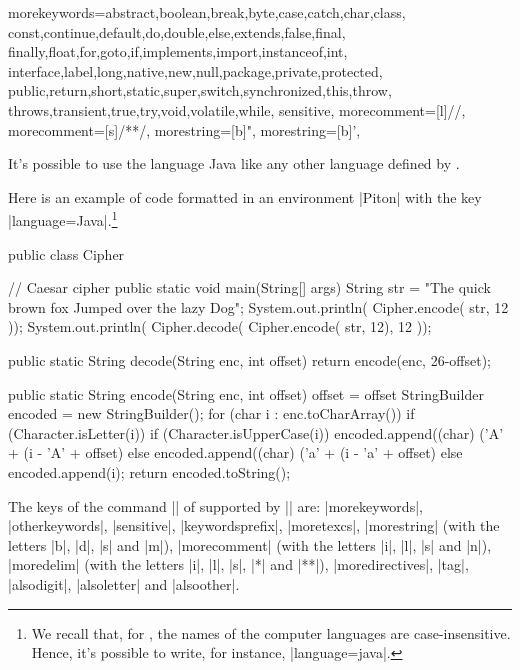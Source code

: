 \documentclass{article}
\begin{document}
  {morekeywords={abstract,boolean,break,byte,case,catch,char,class,
      const,continue,default,do,double,else,extends,false,final,
      finally,float,for,goto,if,implements,import,instanceof,int,
      interface,label,long,native,new,null,package,private,protected,
      public,return,short,static,super,switch,synchronized,this,throw,
      throws,transient,true,try,void,volatile,while},
   sensitive,
   morecomment=[l]//,
   morecomment=[s]{/*}{*/},
   morestring=[b]",
   morestring=[b]',
  }

\medskip
It's possible to use the language Java like any other language defined by
.

Here is an example of code formatted in an environment |{Piton}| with
the key |language=Java|.\footnote{We recall that, for , the names
of the computer languages are case-insensitive. Hence, it's possible to
write, for instance, |language=java|.}


\bigskip
\begingroup
\small
{}
\begin{Piton}[language = java]
public class Cipher {  // Caesar cipher
    public static void main(String[] args) {
        String str = "The quick brown fox Jumped over the lazy Dog";
        System.out.println( Cipher.encode( str, 12 ));
        System.out.println( Cipher.decode( Cipher.encode( str, 12), 12 ));
    }

    public static String decode(String enc, int offset) {
        return encode(enc, 26-offset);
    }

    public static String encode(String enc, int offset) {
        offset = offset %
        StringBuilder encoded = new StringBuilder();
        for (char i : enc.toCharArray()) {
            if (Character.isLetter(i)) {
                if (Character.isUpperCase(i)) {
                    encoded.append((char) ('A' + (i - 'A' + offset) %
                } else {
                    encoded.append((char) ('a' + (i - 'a' + offset) %
                }
            } else {
                encoded.append(i);
            }
        }
        return encoded.toString();
    }
}
\end{Piton}
\endgroup

\bigskip

The keys of the command |\lstdefinelanguage| of  supported by |\NewPitonLanguage| are:
|morekeywords|, |otherkeywords|, |sensitive|, |keywordsprefix|, |moretexcs|,
|morestring| (with the letters |b|,
|d|, |s| and |m|), |morecomment| (with the letters |i|, |l|, |s| and |n|),
|moredelim| (with the letters |i|,
|l|, |s|, |*| and |**|), |moredirectives|, |tag|, |alsodigit|, |alsoletter|
and |alsoother|.
\end{document}
